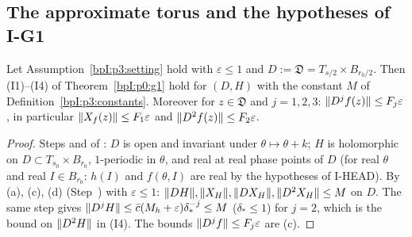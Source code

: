 \subsection{The approximate torus and the hypotheses of I-G1}\label{bpI:p3:sec-torus}

\begin{lemma}[The hypotheses (I1)--(I4) for $H=h+f$]\label{bpI:p3:hypothesis-d}
Let Assumption~\ref{bpI:p3:setting} hold with $\varepsilon\le1$ and $D:=\mathfrak D=T_{s/2}\times B_{r_0/2}$. Then (I1)--(I4) of Theorem~\ref{bpI:p0:g1} hold for $(D,H)$ with
the constant $M$ of Definition~\ref{bpI:p3:constants}. Moreover for $z\in\mathfrak D$ and $j=1,2,3$: $\lVert D^jf(z)\rVert\le F_j\varepsilon$, in particular $\lVert X_f(z)\rVert\le F_1\varepsilon$ and
$\lVert D^2f(z)\rVert\le F_2\varepsilon$.
\end{lemma}
\begin{proof}
\label{stepI:p3:hd-open}
Steps  and  of : $D$ is open and invariant under $\theta\mapsto\theta+k$; $H$ is holomorphic on $D\subset T_{s_0}\times B_{r_0}$, $1$-periodic in $\theta$,
and real at real phase points of $D$ (for real $\theta$ and real $I\in B_{r_0}$: $h(I)$ and $f(\theta,I)$ are real by the hypotheses of I-HEAD).
\label{stepI:p3:hd-bounds}
By (a), (c), (d) (Step~) with $\varepsilon\le1$: $\lVert DH\rVert,\lVert X_H\rVert,\lVert DX_H\rVert,\lVert D^2X_H\rVert\le M$ on $D$.
The same step gives $\lVert D^jH\rVert\le\bar c(M_h+\varepsilon)\delta_*^{-j}\le M$ ($\delta_*\le1$) for $j=2$, which is the bound on $\lVert D^2H\rVert$ in (I4). The bounds $\lVert D^jf\rVert\le F_j\varepsilon$ are (c).
\end{proof}

